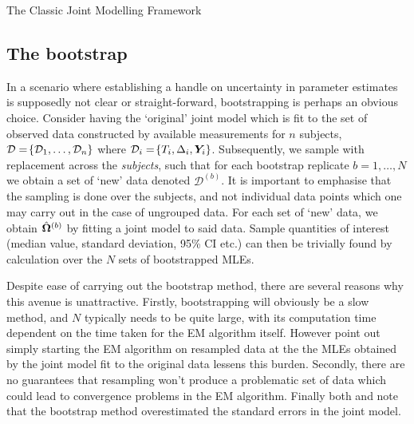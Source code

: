 \begin{chapter}{\label{cha:methods-classic}The Classic Joint Modelling Framework}
  \subsection{The bootstrap}\label{sec:methods-SE-bootsrap}
  In a scenario where establishing a handle on uncertainty in parameter estimates is supposedly not clear or straight-forward, bootstrapping is perhaps an obvious choice. Consider having the `original' joint model which is fit to the set of observed data constructed by available measurements for $n$ subjects, $\mathcal{D}=\!\left\{\mathcal{D}_1,\dots,\mathcal{D}_n\right\}$ where $\mathcal{D}_i=\!\left\{ T_i, \Delta_i, \bm{Y}_i\right\}$. Subsequently, we sample with replacement across the \textit{subjects}, such that for each bootstrap replicate $b=1,\dots,N$ we obtain a set of `new' data denoted $\mathcal{D}^{(b)}$. It is important to emphasise that the sampling is done over the subjects, and not individual data points which one may carry out in the case of ungrouped data. For each set of `new' data, we obtain $\hat{\bm{\Omega}}^{(b)}$ by fitting a joint model to said data. Sample quantities of interest (median value, standard deviation, 95\% CI etc.) can then be trivially found by calculation over the $N$ sets of bootstrapped MLEs.
  
  Despite ease of carrying out the bootstrap method, there are several reasons why this avenue is unattractive. Firstly, bootstrapping will obviously be a slow method, and $N$ typically needs to be quite large, with its computation time dependent on the time taken for the EM algorithm itself. However \citet{Hickey2018} point out simply starting the EM algorithm on resampled data at the the MLEs obtained by the joint model fit to the original data lessens this burden. Secondly, there are no guarantees that resampling won't produce a problematic set of data which could lead to convergence problems in the EM algorithm. Finally both \citet{Hsieh2006} and \citet{Xu2014} note that the bootstrap method overestimated the standard errors in the joint model.
  

\end{chapter}
